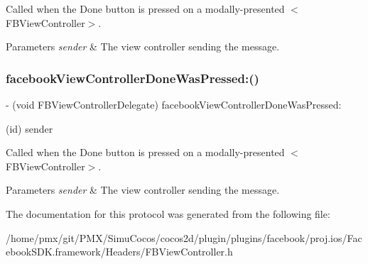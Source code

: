 Called when the Done button is pressed on a modally-\/presented $<$\+F\+B\+View\+Controller$>$.


\begin{DoxyParams}{Parameters}
{\em sender} & The view controller sending the message. \\
\hline
\end{DoxyParams}
\mbox{\label{protocolFBViewControllerDelegate_01-p_aaba5fa381dc330b33a2931e1b1b7589c}} 
\subsubsection{\texorpdfstring{facebook\+View\+Controller\+Done\+Was\+Pressed\+:()}{facebookViewControllerDoneWasPressed:()}\hspace{0.1cm}{\footnotesize\ttfamily [5/5]}}
{\footnotesize\ttfamily -\/ (void F\+B\+View\+Controller\+Delegate) facebook\+View\+Controller\+Done\+Was\+Pressed\+: \begin{DoxyParamCaption}\item[{(id)}]{sender }\end{DoxyParamCaption}\hspace{0.3cm}{\ttfamily [optional]}}

Called when the Done button is pressed on a modally-\/presented $<$\+F\+B\+View\+Controller$>$.


\begin{DoxyParams}{Parameters}
{\em sender} & The view controller sending the message. \\
\hline
\end{DoxyParams}


The documentation for this protocol was generated from the following file\+:\begin{DoxyCompactItemize}
\item 
/home/pmx/git/\+P\+M\+X/\+Simu\+Cocos/cocos2d/plugin/plugins/facebook/proj.\+ios/\+Facebook\+S\+D\+K.\+framework/\+Headers/F\+B\+View\+Controller.\+h\end{DoxyCompactItemize}
